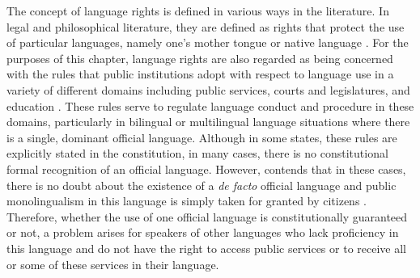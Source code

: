 \documentclass[output=paper,colorlinks,citecolor=brown]{langscibook}
\begin{document}
The concept of language rights is defined in various ways in the literature. In legal and philosophical literature, they are defined as rights that protect the use of particular languages, namely one’s mother tongue or native language \citep[233]{Pinto2014}. For the purposes of this chapter, language rights are also regarded as being concerned with the rules that public institutions adopt with respect to language use in a variety of different domains including public services, courts and legislatures, and education \citep{Arzoz2007}. These rules serve to regulate language conduct and procedure in these domains, particularly in bilingual or multilingual language situations where there is a single, dominant official language. Although in some states, these rules are explicitly stated in the constitution, in many cases, there is no constitutional formal recognition of an official language. However, \citet[18]{Arzoz2007} contends that in these cases, there is no doubt about the existence of a \emph{de facto} official language and public monolingualism in this language is simply taken for granted by citizens \citep{May2014}. Therefore, whether the use of one official language is constitutionally guaranteed or not, a problem arises for speakers of other languages who lack proficiency in this language and do not have the right to access public services or to receive all or some of these services in their language. 
\end{document}
